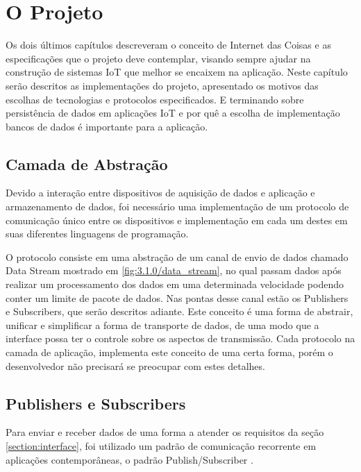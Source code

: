 \chapter{O Projeto}
\label{chapter:projeto}

Os dois últimos capítulos descreveram o conceito de Internet das Coisas e as especificações que o projeto deve contemplar, visando sempre ajudar na construção de sistemas IoT que melhor se encaixem na aplicação. Neste capítulo serão descritos as implementações do projeto, apresentado os motivos das escolhas de tecnologias e protocolos especificados. E terminando sobre persistência de dados em aplicações IoT e por quê a escolha de implementação bancos de dados é importante para a aplicação.


\section{Camada de Abstração}
\label{section:camada_abstracao}

Devido a interação entre dispositivos de aquisição de dados e aplicação e armazenamento de dados, foi necessário uma implementação de um protocolo de comunicação único entre os dispositivos e implementação em cada um destes em suas diferentes linguagens de programação.

O protocolo consiste em uma abstração de um canal de envio de dados chamado Data Stream mostrado em \ref{fig:3.1.0/data_stream}, no qual passam dados após realizar um processamento dos dados em uma determinada velocidade podendo conter um limite de pacote de dados. Nas pontas desse canal estão os Publishers e Subscribers, que serão descritos adiante. Este conceito é uma forma de abstrair, unificar e simplificar a forma de transporte de dados, de uma modo que a interface possa ter o controle sobre os aspectos de transmissão. Cada protocolo na camada de aplicação, implementa este conceito de uma certa forma, porém o desenvolvedor não precisará se preocupar com estes detalhes.


\section{Publishers e Subscribers}
\label{section:publishers_subscribers}

Para enviar e receber dados de uma forma a atender os requisitos da seção \ref{section:interface}, foi utilizado um padrão de comunicação recorrente em aplicações contemporâneas, o padrão Publish/Subscriber \cite{amazon:pub-sub}.

